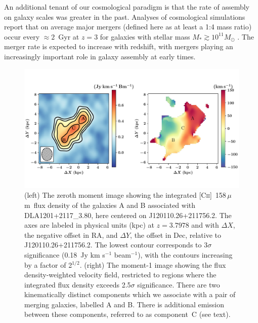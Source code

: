 \documentclass[twocolumn]{aastex62}
\newcommand{\dlaname}{DLA1201+2117\_3.80}
\newcommand{\origpos}{J120110.26+211756.2}
\newcommand{\cplus}{[\ctwo]~158\,$\mu$m}
\newcommand{\tsiglim}{0.18}  %
\newcommand{\mstareq}{M_*}
\newcommand{\mmsun}{M_{\odot}}
\newcommand{\ctwo}{C\textsc{ii}}
\begin{document}
An additional tenant of our cosmological paradigm is that the rate of assembly on 
galaxy scales was greater in the past. Analyses of cosmological simulations report that on average major mergers (defined here as at least a 1:4 mass ratio) occur every $\approx 2$~Gyr at $z=3$ for galaxies with 
stellar mass $\mstareq \gtrsim 10^{11} \mmsun$ \citep{aldo+2017}.
The merger rate is expected to increase with redshift, with 
mergers playing an increasingly important role in galaxy assembly at early times.


\begin{figure}
\centering
\includegraphics[width=\textwidth]{fig_moments.pdf}
\vspace{-0.3in}
\caption{(left) The zeroth moment image showing the integrated \cplus\ flux density 
of the galaxies A and B associated with \dlaname, here centered on \origpos.
The axes are labeled in physical units (kpc) at $z=3.7978$ and with 
$\Delta X$, the negative offset in RA, and $\Delta Y$, the offset in Dec, relative 
to \origpos. 
The lowest contour corresponds to $3\sigma$ significance 
(\tsiglim~Jy km s$^{-1}$ beam$^{-1}$), with the contours increasing by a factor 
of 2$^{1/2}$. 
(right) The moment-1 image showing the flux density-weighted velocity 
field, restricted to regions where the integrated flux density exceeds 2.5$\sigma$ 
significance. There are two kinematically distinct components which we associate 
with a pair of merging galaxies, labelled A and B. There is additional emission between 
these components, referred to as component~C (see text).
}
\label{fig:moments}
\end{figure}
%
\end{document}
